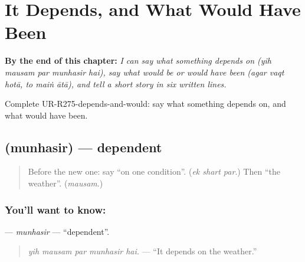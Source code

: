 
\chapter{It Depends, and What Would Have Been}
\label{ch:ur-it-depends-and-what-would-have-been}

\begin{chapteropening}
\textbf{By the end of this chapter:} \emph{I can say what something depends on (yih mausam par munhasir hai), say what would be or would have been (agar vaqt hotā, to maiṅ ātā), and tell a short story in six written lines.}

Complete UR-R275-depends-and-would: say what something depends on, and what would have been.
\end{chapteropening}

\section[\texorpdfstring{\ur{منحصر} (munhasir)}{منحصر (munhasir)}]{ (munhasir) — dependent}

\label{lesson:UR-C275-munhasir}



\begin{quote}
Before the new one: say \textquotedblleft{}on one condition\textquotedblright{}. (\emph{ek shart par}.) Then \textquotedblleft{}the weather\textquotedblright{}. (\emph{mausam}.)
\end{quote}

\subsection*{You'll want to know: }
\textbf{} — \emph{munhasir} — \textquotedblleft{}dependent\textquotedblright{}.

\begin{quote}
\textbf{    }
\end{quote}

\begin{quote}
\emph{yih mausam par munhasir hai.} — \textquotedblleft{}It depends on the weather.\textquotedblright{}
\end{quote}


